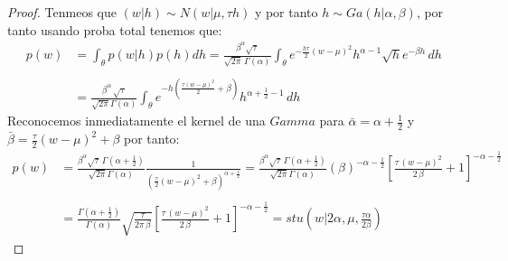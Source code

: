 \documentclass[11pt,letterpaper]{article}
\begin{document}
\begin{proof}
    Tenmeos que $(w|h)\sim N(w|\mu,\tau h)$ y por tanto $h\sim Ga(h|\alpha,\beta)$, por tanto usando proba total tenemos que:\,\\
    \begin{align*}
        p(w)&=\int_{\theta}p(w|h)p(h)dh=\frac{\beta^{\alpha}\sqrt{\tau}}{\sqrt{2\pi }\,\Gamma(\alpha)}\int_{\theta}e^{-\frac{h\tau}{2}(w-\mu)^2}h^{\alpha-1}\sqrt{h}e^{-\beta h}\,dh\,\\
        \,\\
        &=\frac{\beta^{\alpha}\,\sqrt{\tau}}{\sqrt{2\pi}\Gamma(\alpha)}\int_{\theta} e^{-h(\frac{\tau (w-\mu)^2}{2}+\beta)}h^{\alpha+\frac{1}{2}-1}\,dh
    \end{align*}
    Reconocemos inmediatamente el kernel de una $Gamma$ para $\bar{\alpha}=\alpha+\frac{1}{2}$ y $\bar{\beta}=\frac{\tau}{2}(w-\mu)^2+\beta$ por tanto:\,\\
    \begin{align*}
        p(w)&=\frac{\beta^{\alpha}\sqrt{\tau}\,\Gamma(\alpha+\frac{1}{2})}{\sqrt{2\pi}\Gamma(\alpha)}\frac{1}{\left(\frac{\tau}{2}(w-\mu)^2+\beta\right)^{\alpha+\frac{1}{2}}}=\frac{\beta^{\alpha}\sqrt{\tau}\,\Gamma(\alpha+\frac{1}{2})}{\sqrt{2\pi}\Gamma(\alpha)}(\beta)^{-\alpha-\frac{1}{2}}\left[\frac{\tau\,(w-\mu)^2}{2\,\beta}+1\right]^{-\alpha-\frac{1}{2}}\,\\
        \,\\
        &=\frac{\Gamma(\alpha+\frac{1}{2})}{\Gamma(\alpha)}\sqrt{\frac{\tau}{2\pi\,\beta}}\left[\frac{\tau\,(w-\mu)^2}{2\,\beta}+1\right]^{-\alpha-\frac{1}{2}}=stu\left(w|2\alpha,\mu,\frac{\tau\alpha}{2\beta}\right)
    \end{align*}
\end{proof}
\end{document}
